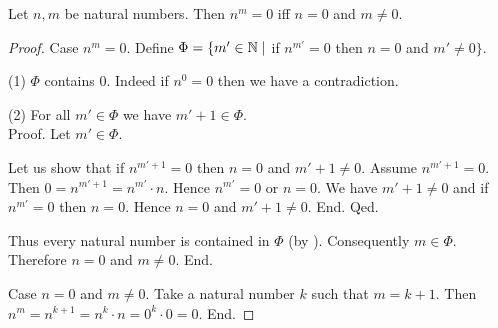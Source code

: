 \documentclass[10pt]{article}
\begin{document}
  \begin{forthel}
    \begin{proposition}[id=ARITHMETIC_09_3860221447372800,printid]
      Let $n, m$ be natural numbers.
      Then $n^{m} = 0$ iff $n = 0$ and $m \neq 0$.
    \end{proposition}
    \begin{proof}
      Case $n^{m} = 0$.
        Define $\Phi = \{ m' \in \mathbb{N} \mid$ if $n^{m'} = 0$ then $n = 0$ and $m' \neq 0 \}$.

        (1) $\Phi$ contains $0$.
        Indeed if $n^{0} = 0$ then we have a contradiction.

        (2) For all $m' \in \Phi$ we have $m' + 1 \in \Phi$. \\
        Proof.
          Let $m' \in \Phi$.

          Let us show that if $n^{m' + 1} = 0$ then $n = 0$ and $m' + 1 \neq 0$.
            Assume $n^{m' + 1} = 0$.
            Then $0 = n^{m' + 1} = n^{m'} \cdot n$.
            Hence $n^{m'} = 0$ or $n = 0$.
            We have $m' + 1 \neq 0$ and if $n^{m'} = 0$ then $n = 0$.
            Hence $n = 0$ and $m' + 1 \neq 0$.
          End.
        Qed.

        Thus every natural number is contained in $\Phi$ (by ).
        Consequently $m \in \Phi$.
        Therefore $n = 0$ and $m \neq 0$.
      End.

      Case $n = 0$ and $m \neq 0$.
        Take a natural number $k$ such that $m = k + 1$.
        Then $n^{m}
          = n^{k + 1}
          = n^{k} \cdot n
          = 0^{k} \cdot 0
          = 0$.
      End.
    \end{proof}
  \end{forthel}
\end{document}
